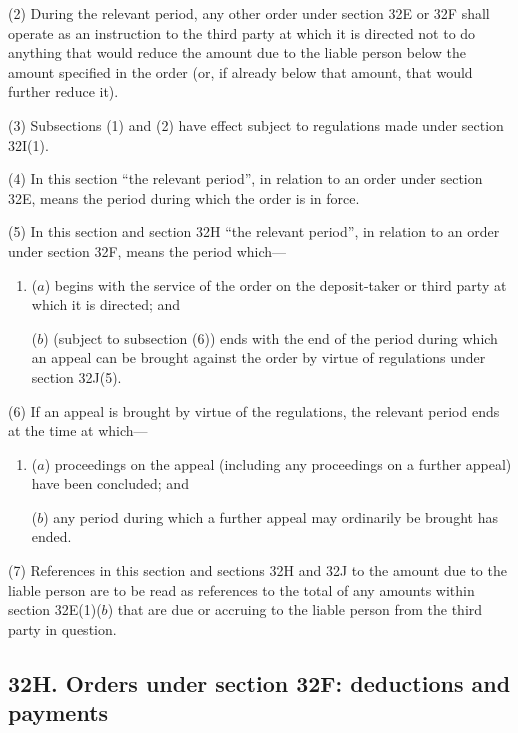 \documentclass[12pt,a4paper]{article}
\begin{document}
(2)
During the relevant period, any other order under section 32E or 32F shall operate as an instruction to the third party at which it is directed not to do anything that would reduce the amount due to the liable person below the amount specified in the order (or, if already below that amount, that would further reduce it).

(3)
Subsections (1) and (2) have effect subject to regulations made under section 32I(1).

(4)
In this section “the relevant period”, in relation to an order under section 32E, means the period during which the order is in force.

(5)
In this section and section 32H “the relevant period”, in relation to an order under section 32F, means the period which---
\begin{enumerate}\item[]
($a$) begins with the service of the order on the deposit-taker or third party at which it is directed; and

($b$) (subject to subsection (6)) ends with the end of the period during which an appeal can be brought against the order by virtue of regulations under section 32J(5).
\end{enumerate}

(6) If an appeal is brought by virtue of the regulations, the relevant period ends at the time at which---
\begin{enumerate}\item[]
($a$) proceedings on the appeal (including any proceedings on a further appeal) have been concluded; and

($b$) any period during which a further appeal may ordinarily be brought has ended.
\end{enumerate}

(7) References in this section and sections 32H and 32J to the amount due to the liable person are to be read as references to the total of any amounts within section 32E(1)($b$) that are due or accruing to the liable person from the third party in question.


\subsection{32H. Orders under section 32F: deductions and payments}
\end{document}
